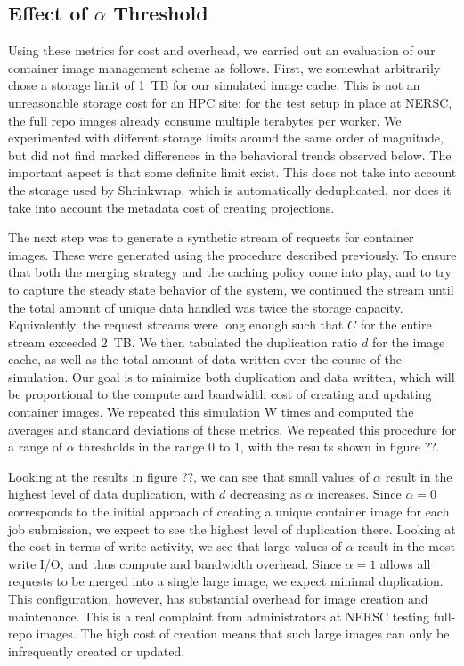 \documentclass[conference]{IEEEtran}
\begin{document}
\subsection{Effect of $\alpha$ Threshold}

Using these metrics for cost and overhead,
we carried out an evaluation of our container image management scheme as follows.
First, we somewhat arbitrarily chose a storage limit of 1~TB for our simulated image cache.
This is not an unreasonable storage cost for an HPC site;
for the test setup in place at NERSC,
the full repo images already consume multiple terabytes per worker.
We experimented with different storage limits around the same order of magnitude,
but did not find marked differences in the behavioral trends observed below.
The important aspect is that some definite limit exist.
This does not take into account the storage used by Shrinkwrap,
which is automatically deduplicated,
nor does it take into account the metadata cost of creating projections.

The next step was to generate a synthetic stream of requests for container images.
These were generated using the procedure described previously.
To ensure that both the merging strategy and the caching policy come into play,
and to try to capture the steady state behavior of the system,
we continued the stream until the total amount of unique data handled was twice the storage capacity.
Equivalently, the request streams were long enough such that $C$ for the entire stream exceeded 2~TB.
We then tabulated the duplication ratio $d$ for the image cache,
as well as the total amount of data written over the course of the simulation.
Our goal is to minimize both duplication and data written,
which will be proportional to the compute and bandwidth cost of creating and updating container images.
We repeated this simulation W times and computed the averages and standard deviations of these metrics.
We repeated this procedure for a range of $\alpha$ thresholds in the range 0 to 1,
with the results shown in figure ??.

Looking at the results in figure ??,
we can see that small values of $\alpha$ result in the highest level of data duplication,
with $d$ decreasing as $\alpha$ increases.
Since $\alpha=0$ corresponds to the initial approach of creating a unique container image for each job submission,
we expect to see the highest level of duplication there.
Looking at the cost in terms of write activity,
we see that large values of $\alpha$ result in the most write I/O,
and thus compute and bandwidth overhead.
Since $\alpha=1$ allows all requests to be merged into a single large image,
we expect minimal duplication.
This configuration, however,
has substantial overhead for image creation and maintenance.
This is a real complaint from administrators at NERSC testing full-repo images.
The high cost of creation means that such large images can only be infrequently created or updated.
\end{document}
